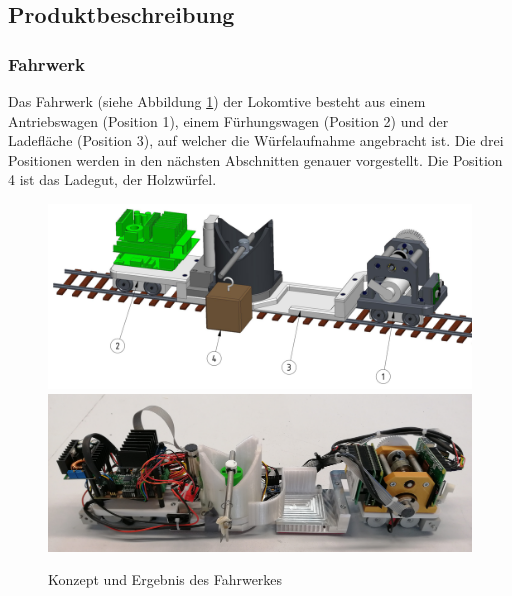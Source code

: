 \documentclass[../../main.tex]{subfiles}
\begin{document}

\subsection{Produktbeschreibung}

\subsubsection{Fahrwerk}

Das Fahrwerk (siehe Abbildung \ref{fig:konzeptfahrwerk}) der Lokomtive besteht aus einem Antriebswagen (Position 1), einem Fürhungswagen (Position 2) und der Ladefläche (Position 3), auf welcher die Würfelaufnahme angebracht ist. Die drei Positionen werden in den nächsten Abschnitten genauer vorgestellt. Die Position 4 ist das Ladegut, der Holzwürfel.\\

\begin{figure}[H]
   \centering
   \includegraphics[width=.95\textwidth]{../../images/Maschinentechnik/lokomotive.PNG}
   \includegraphics[width=.95\textwidth]{../../images/Maschinentechnik/lokomotive2.PNG}
   \caption {Konzept und Ergebnis des Fahrwerkes}
   \label{fig:konzeptfahrwerk}
\end{figure}
\end{document}

